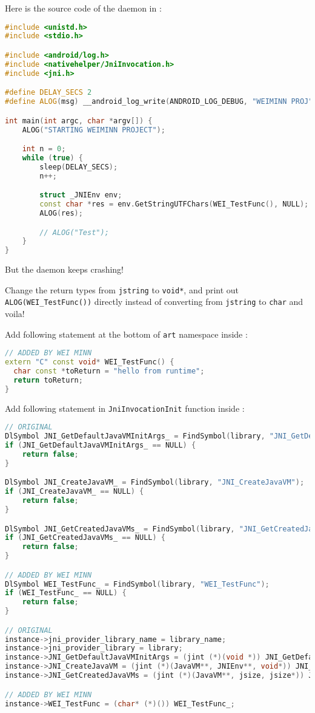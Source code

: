 Here is the source code of the daemon in : 
\begin{lstlisting}[language=C++]
#include <unistd.h> 
#include <stdio.h> 

#include <android/log.h> 
#include <nativehelper/JniInvocation.h>
#include <jni.h>

#define DELAY_SECS 2 
#define ALOG(msg) __android_log_write(ANDROID_LOG_DEBUG, "WEIMINN PROJ", msg)

int main(int argc, char *argv[]) {
    ALOG("STARTING WEIMINN PROJECT");

    int n = 0; 
    while (true) {
        sleep(DELAY_SECS);
        n++; 

        struct _JNIEnv env;
        const char *res = env.GetStringUTFChars(WEI_TestFunc(), NULL);
        ALOG(res);

        // ALOG("Test");
    }
}
\end{lstlisting}
But the daemon keeps crashing!

Change the return types from \texttt{jstring} to \texttt{void*}, and print out \texttt{ALOG(WEI\_TestFunc())} directly instead of converting from \texttt{jstring} to \texttt{char} and voila!

Add following statement at the bottom of \texttt{art} namespace inside : 
\begin{lstlisting}[language=C++]
// ADDED BY WEI MINN
extern "C" const void* WEI_TestFunc() {
  char const *toReturn = "hello from runtime";
  return toReturn;
}
\end{lstlisting}

Add following statement in \texttt{JniInvocationInit} function inside : 
\begin{lstlisting}[language=C++]
// ORIGINAL
DlSymbol JNI_GetDefaultJavaVMInitArgs_ = FindSymbol(library, "JNI_GetDefaultJavaVMInitArgs");
if (JNI_GetDefaultJavaVMInitArgs_ == NULL) {
    return false;
}

DlSymbol JNI_CreateJavaVM_ = FindSymbol(library, "JNI_CreateJavaVM");
if (JNI_CreateJavaVM_ == NULL) {
    return false;
}

DlSymbol JNI_GetCreatedJavaVMs_ = FindSymbol(library, "JNI_GetCreatedJavaVMs");
if (JNI_GetCreatedJavaVMs_ == NULL) {
    return false;
}

// ADDED BY WEI MINN
DlSymbol WEI_TestFunc_ = FindSymbol(library, "WEI_TestFunc");
if (WEI_TestFunc_ == NULL) {
    return false;
}

// ORIGINAL
instance->jni_provider_library_name = library_name;
instance->jni_provider_library = library;
instance->JNI_GetDefaultJavaVMInitArgs = (jint (*)(void *)) JNI_GetDefaultJavaVMInitArgs_;
instance->JNI_CreateJavaVM = (jint (*)(JavaVM**, JNIEnv**, void*)) JNI_CreateJavaVM_;
instance->JNI_GetCreatedJavaVMs = (jint (*)(JavaVM**, jsize, jsize*)) JNI_GetCreatedJavaVMs_;

// ADDED BY WEI MINN
instance->WEI_TestFunc = (char* (*)()) WEI_TestFunc_;
\end{lstlisting}

